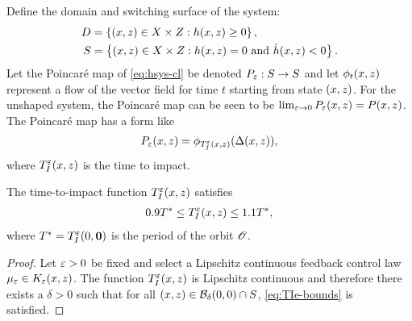 \documentclass[twocolumn]{article}
\begin{document}
Define the domain and switching surface of the system:
\begin{align}
  D &= \left\{ (x, z) \in X \times Z : h(x, z) \geq 0 \right\},\\
  \nonumber
  S &= \left\{ (x, z) \in X \times Z : h(x, z) = 0 \mbox{ and } {\dot h}(x, z) < 0 \right\}.
\end{align}
Let the Poincar{\'e} map of \eqref{eq:hsys-cl} be denoted $P_{\varepsilon} : S \to S$ and let $\phi_{t}(x, z)$ represent a flow of the vector field for time $t$ starting from state $(x, z)$.
%
For the unshaped system, the Poincar{\'e} map can be seen to be $\lim_{\varepsilon \to 0} P_{\varepsilon}(x, z) = P(x, z)$.
%
The Poincar{\'e} map has a form like
\begin{align}
  P_{\varepsilon}(x, z) = \phi_{T_{I}^{\varepsilon}(x, z)}(\Delta(x, z)),
\end{align}
where $T_{I}^{\varepsilon}(x, z)$ is the time to impact.

\begin{lemma}
  The time-to-impact function $T_{I}^{\varepsilon}(x, z)$ satisfies
  \begin{align}
    \label{eq:TIe-bounds}
    0.9 T^{*} \leq T_{I}^{\varepsilon}(x, z) \leq 1.1 T^{*},
  \end{align}
  where $T^{*} = T_{I}^{\varepsilon}(0, {\mathbf 0})$ is the period of the orbit ${\mathscr O}$.
\end{lemma}
\begin{proof}
  Let $\varepsilon > 0$ be fixed and select a Lipschitz continuous feedback control law $\mu_{\varepsilon} \in K_{\varepsilon}(x, z)$. The function $T_{I}^{\varepsilon}(x, z)$ is Lipschitz continuous and therefore there exists a $\delta > 0$ such that for all $(x, z) \in {\mathcal B}_{\delta}(0, 0) \cap S$, \eqref{eq:TIe-bounds} is satisfied.
\end{proof}
\end{document}
